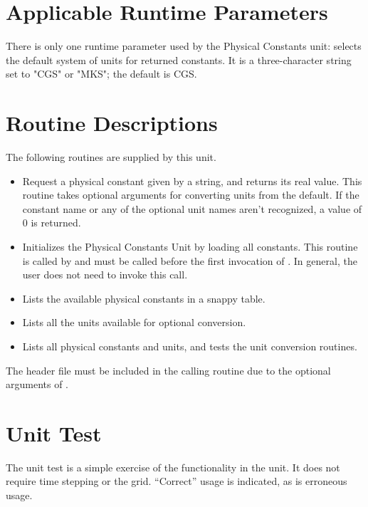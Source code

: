 \section{Applicable Runtime Parameters}
\label{sec:PhysicalConstantsRP}

There is only one runtime parameter used by the Physical Constants
unit:
 selects the default system of units for
returned constants.  It is a three-character string set to "CGS" or
"MKS";  the default is CGS.


\section{Routine Descriptions}
\label{sec:PhysicalConstantsRoutines}

The following routines are supplied by this unit.

\begin{itemize}
\item
    Request a physical constant given by a string, and
    returns its real value.  This routine takes
    optional arguments for converting units from the default.  If
    the constant name or any of the optional unit names aren't recognized, a
    value of 0 is returned.

\item
    Initializes the Physical Constants Unit by loading all
    constants.  This routine is called by  and must be called before the
    first invocation of .
    In general, the user does not need to invoke this call.

\item
    Lists the available physical constants in a snappy table.

\item
    Lists all the units available for optional conversion.

\item
    Lists all physical constants and units, and tests the unit conversion
    routines.

\end{itemize}


\begin{flashtip}
The header file  must be included in the
calling routine due to the optional arguments of
.
\end{flashtip}

\section{Unit Test}
\label{Sec:PhysConstUnitTest}
The  unit test 
is a simple exercise of the functionality 
in the unit.  It does not require time stepping or the grid.
``Correct'' usage is indicated, as is erroneous usage.

